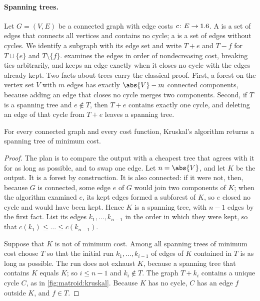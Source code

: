 \begin{refsection}
\paragraph{Spanning trees.} Let $G=(V,E)$ be a connected graph with edge costs $c\colon E\to1.6$. A  is a set of edges that connects all vertices and contains no cycle; a  is a set of edges without cycles. We identify a subgraph with its edge set and write $T+e$ and $T-f$ for $T\cup\{e\}$ and $T\setminus\{f\}$.  examines the edges in order of nondecreasing cost, breaking ties arbitrarily, and keeps an edge exactly when it closes no cycle with the edges already kept. Two facts about trees carry the classical proof. First, a forest on the vertex set $V$ with $m$ edges has exactly $\abs{V}-m$ connected components, because adding an edge that closes no cycle merges two components. Second, if $T$ is a spanning tree and $e\notin T$, then $T+e$ contains exactly one cycle, and deleting an edge of that cycle from $T+e$ leaves a spanning tree.

\begin{theorem}\label{thm:matroid:kruskal-old}
For every connected graph and every cost function, Kruskal's algorithm returns a spanning tree of minimum cost.
\end{theorem}

\begin{proof}
The plan is to compare the output with a cheapest tree that agrees with it for as long as possible, and to swap one edge. Let $n=\abs{V}$, and let $K$ be the output. It is a forest by construction. It is also connected: if it were not, then, because $G$ is connected, some edge $e$ of $G$ would join two components of $K$; when the algorithm examined $e$, its kept edges formed a subforest of $K$, so $e$ closed no cycle and would have been kept. Hence $K$ is a spanning tree, with $n-1$ edges by the first fact. List its edges $k_1,\dots,k_{n-1}$ in the order in which they were kept, so that $c(k_1)\le\dots\le c(k_{n-1})$.

Suppose that $K$ is not of minimum cost. Among all spanning trees of minimum cost choose $T$ so that the initial run $k_1,\dots,k_{i-1}$ of edges of $K$ contained in $T$ is as long as possible. The run does not exhaust $K$, because a spanning tree that contains $K$ equals $K$; so $i\le n-1$ and $k_i\notin T$. The graph $T+k_i$ contains a unique cycle $C$, as in \cref{fig:matroid:kruskal}. Because $K$ has no cycle, $C$ has an edge $f$ outside $K$, and $f\in T$.


\end{proof}
\end{refsection}
